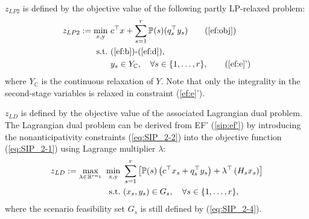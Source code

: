 %

$z_{LP2}$ is defined by the objective value of the following partly LP-relaxed problem:
\begin{subequations}\label{ef-lp2}
	\begin{align}
	z_{LP2}:=\min_{x,\mathrm{y}}\ & c^{\top}x + \sum_{s=1}^{r}\PP(s) (q_s^{\top}y_s) \tag{\ref{ef:obj}}\\ 
	\mathrm{s.t.}\ &\textrm{(\ref{ef:b})-(\ref{ef:d})}, \nonumber \\
	& y_s\in Y_\mathbb{C} ,\quad\forall s\in\{1,\ldots,r\}, \tag{\ref{ef:e}'}
	\end{align}
\end{subequations}
where $Y_\mathbb{C}$ is the continuous relaxation of $Y$.
Note that only the integrality in the second-stage variables is relaxed in constraint (\ref{ef:e}').

$z_{LD}$ is defined by the objective value of the associated Lagrangian dual problem. The Lagrangian dual problem can be derived from EF' (\ref{sip:ef'}) by introducing the nonanticipativity constraints (\ref{eq:SIP_2-2}) into the objective function (\ref{eq:SIP_2-1}) using Lagrange multiplier $\lambda$:
\begin{subequations}\label{ld}
	\begin{align}
	z_{LD}:=\max_{\lambda\in\mathbb{R}^{rn_1}}\ \min_{\mathrm{x},\mathrm{y}}\   &\sum_{s=1}^{r}\left[\operatorname*{\mathbb{P}}(s)\left(c^{\top}x_s+q_s^{\top}y_s\right)+\lambda^\top \left(H_s x_s\right)\right] \label{ld:obj}\\ 
	\mathrm{s.t.}\ & (x_s,y_s)\in G_s,\quad \forall s\in\{1,\ldots,r\},	 \label{ld:b}
	\end{align}
\end{subequations}
where the scenario feasibility set $G_s$ is still defined by (\ref{eq:SIP_2-4}).

